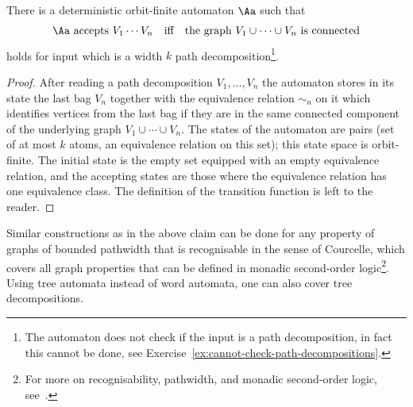 \begin{myexample}
	 \begin{claim}\label{claim:connected}
	 There is a deterministic orbit-finite automaton $\Aa$ such that
	 \begin{align*}
	 \Aa \text{ accepts }V_1 \cdots V_n \quad \text{iff} \quad \text{the  graph $V_1 \cup \cdots \cup V_n$ is connected}
	 \end{align*}
	 holds for input which is a width $k$ path decomposition\footnote{The automaton does not check if the input is a path decomposition, in fact this cannot be done, see Exercise~\ref{ex:cannot-check-path-decompositions}.}.
	 \end{claim}
	 \begin{proof}
	 After reading a path decomposition $V_1,\ldots,V_n$ the automaton stores in its state the last bag $V_n$ together with the equivalence relation $\sim_n$ on it which identifies vertices from the last bag if they are in the same connected component of the underlying graph $V_1 \cup \cdots \cup V_n$.  
	 The states of the automaton are pairs (set of at most $k$ atoms, an equivalence relation on this set); this state space is orbit-finite. The initial state is the empty set equipped with an empty equivalence relation, and the accepting states are those where the equivalence relation has one equivalence class. 
	 The definition of the transition function is left to the reader. 
	 \end{proof}
	
	 Similar constructions as in the above claim can be done for any property of graphs of bounded pathwidth that is recognisable in the sense of Courcelle, which covers all graph properties that can be defined in monadic second-order logic\footnote{For more on recognisability, pathwidth, and monadic second-order logic, see~\cite[Chapter 5.3]{courcelleGraphStructureMonadic2012}.}. Using tree automata instead of word automata, one can also cover tree decompositions. 
   \end{myexample}
   


